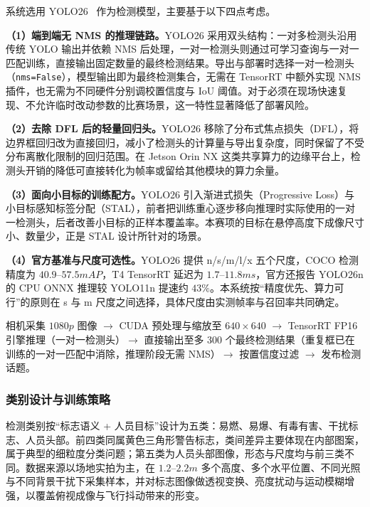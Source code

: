 系统选用 YOLO26~\cite{jocher2026yolo26} 作为检测模型，主要基于以下四点考虑。

\textbf{（1）端到端无 NMS 的推理链路。}YOLO26 采用双头结构：一对多检测头沿用传统 YOLO 输出并依赖 NMS 后处理，一对一检测头则通过可学习查询与一对一匹配训练，直接输出固定数量的最终检测结果。导出与部署时选择一对一检测头（\texttt{nms=False}），模型输出即为最终检测集合，无需在 TensorRT 中额外实现 NMS 插件，也无需为不同硬件分别调校置信度与 IoU 阈值。对于必须在现场快速复现、不允许临时改动参数的比赛场景，这一特性显著降低了部署风险。

\textbf{（2）去除 DFL 后的轻量回归头。}YOLO26 移除了分布式焦点损失（DFL），将边界框回归改为直接回归，减小了检测头的计算量与导出复杂度，同时保留了不受分布离散化限制的回归范围。在 Jetson Orin NX 这类共享算力的边缘平台上，检测头开销的降低可直接转化为帧率或留给其他模块的算力余量。

\textbf{（3）面向小目标的训练配方。}YOLO26 引入渐进式损失（Progressive Loss）与小目标感知标签分配（STAL），前者把训练重心逐步移向推理时实际使用的一对一检测头，后者改善小目标的正样本覆盖率。本赛项的目标在悬停高度下成像尺寸小、数量少，正是 STAL 设计所针对的场景。

\textbf{（4）官方基准与尺度可选性。}YOLO26 提供 n/s/m/l/x 五个尺度，COCO 检测精度为 $40.9$--$57.5\unit{mAP}$，T4 TensorRT 延迟为 $1.7$--$11.8\unit{ms}$，官方还报告 YOLO26n 的 CPU ONNX 推理较 YOLO11n 提速约 $43\%$。本系统按“精度优先、算力可行”的原则在 s 与 m 尺度之间选择，具体尺度由实测帧率与召回率共同确定。

\begin{techbox}
相机采集 $1080\unit{p}$ 图像 $\rightarrow$ CUDA 预处理与缩放至 $640\times640$ $\rightarrow$ TensorRT FP16 引擎推理（一对一检测头）$\rightarrow$ 直接输出至多 300 个最终检测结果（重复框已在训练的一对一匹配中消除，推理阶段无需 NMS）$\rightarrow$ 按置信度过滤 $\rightarrow$ 发布检测话题。
\end{techbox}

\subsubsection{类别设计与训练策略}

检测类别按“标志语义 + 人员目标”设计为五类：易燃、易爆、有毒有害、干扰标志、人员头部。前四类同属黄色三角形警告标志，类间差异主要体现在内部图案，属于典型的细粒度分类问题；第五类为人员头部图像，形态与尺度均与前三类不同。数据来源以场地实拍为主，在 $1.2$--$2.2\unit{m}$ 多个高度、多个水平位置、不同光照与不同背景干扰下采集样本，并对标志图像做透视变换、亮度扰动与运动模糊增强，以覆盖俯视成像与飞行抖动带来的形变。

